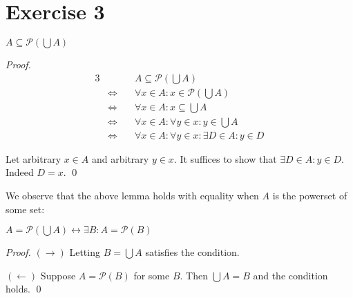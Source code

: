 \documentclass[11pt]{llncs}
\begin{document}
\section*{Exercise 3}
\begin{lemma}
  $A \subseteq \mathcal{P}(\bigcup A)$
\end{lemma}
\begin{proof}
  \begin{alignat*}{3}
                         && A \subseteq \mathcal{P}(\bigcup A) \\
    &\Leftrightarrow\quad & \forall x \in A: x \in \mathcal{P}(\bigcup A)\\
    &\Leftrightarrow\quad & \forall x \in A: x \subseteq \bigcup A\\
    &\Leftrightarrow\quad & \forall x \in A: \forall y \in x: y \in \bigcup A\\
    &\Leftrightarrow\quad & \forall x \in A: \forall y \in x: \exists D \in A: y \in D
  \end{alignat*}

  Let arbitrary $x \in A$ and arbitrary $y \in x$. It suffices to show that
  $\exists D \in A: y \in D$. Indeed $D = x$.
  \qed
\end{proof}

We observe that the above lemma holds with equality when $A$ is the powerset of
some set:

\begin{lemma}
  $A = \mathcal{P}(\bigcup A) \leftrightarrow \exists B: A = \mathcal{P}(B)$
\end{lemma}
\begin{proof}
  \item $(\rightarrow)$ Letting $B = \bigcup A$ satisfies the condition.
  \item $(\leftarrow)$ Suppose $A = \mathcal{P}(B)$ for some $B$. Then
        $\bigcup A = B$ and the condition holds.
  \qed
\end{proof}
\end{document}
